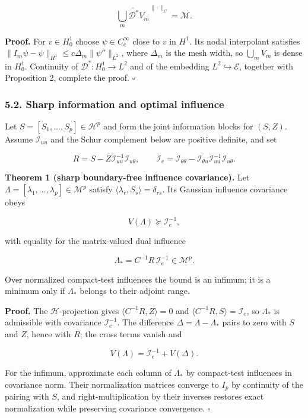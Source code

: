 \documentclass[
  american,
  11pt,
]{article}
\begin{document}
\[
\overline{\bigcup_m\mathcal D^*V_m}^{\|\cdot\|_C}=\mathcal M.
\]

\textbf{Proof.} For \(v\in H_0^1\) choose \(\psi\in C_c^\infty\) close
to \(v\) in \(H^1\). Its nodal interpolant satisfies
\(\|I_m\psi-\psi\|_{H^1}\leq c\Delta_m\|\psi''\|_{L^2}\), where
\(\Delta_m\) is the mesh width, so \(\bigcup_mV_m\) is dense in
\(H_0^1\). Continuity of \(\mathcal D^*:H_0^1\to L^2\) and of the
embedding \(L^2\hookrightarrow\mathcal E\), together with Proposition 2,
complete the proof. \(\square\)

\subsubsection{5.2. Sharp information and optimal
influence}\label{sharp-information-and-optimal-influence}

Let \(S=[S_1,\ldots,S_p]\in\mathcal H^p\) and form the joint information
blocks for \((S,Z)\). Assume \(\mathcal I_{uu}\) and the Schur
complement below are positive definite, and set

\[
R=S-Z\mathcal I_{uu}^{-1}\mathcal I_{u\theta},
\qquad
\mathcal I_e=\mathcal I_{\theta\theta}
-\mathcal I_{\theta u}\mathcal I_{uu}^{-1}\mathcal I_{u\theta}.
\]

\textbf{Theorem 1 (sharp boundary-free influence covariance).} Let
\(\Lambda=[\lambda_1,\ldots,\lambda_p]\in\mathcal M^p\) satisfy
\(\langle\lambda_r,S_s\rangle=\delta_{rs}\). Its Gaussian influence
covariance obeys

\[
V(\Lambda)\succeq\mathcal I_e^{-1},
\]

with equality for the matrix-valued dual influence

\[
\Lambda_*=C^{-1}R\,\mathcal I_e^{-1}\in\mathcal M^p.
\]

Over normalized compact-test influences the bound is an infimum; it is a
minimum only if \(\Lambda_*\) belongs to their adjoint range.

\textbf{Proof.} The \(\mathcal H\)-projection gives
\(\langle C^{-1}R,Z\rangle=0\) and
\(\langle C^{-1}R,S\rangle=\mathcal I_e\), so \(\Lambda_*\) is
admissible with covariance \(\mathcal I_e^{-1}\). The difference
\(\Delta=\Lambda-\Lambda_*\) pairs to zero with \(S\) and \(Z\), hence
with \(R\); the cross terms vanish and

\[
V(\Lambda)=\mathcal I_e^{-1}+V(\Delta).
\]

For the infimum, approximate each column of \(\Lambda_*\) by
compact-test influences in covariance norm. Their normalization matrices
converge to \(I_p\) by continuity of the pairing with \(S\), and
right-multiplication by their inverses restores exact normalization
while preserving covariance convergence. \(\square\)
\end{document}
